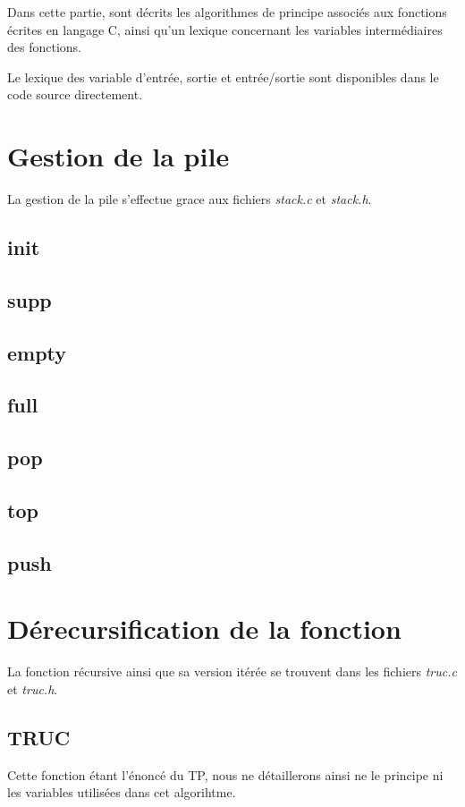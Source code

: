 Dans cette partie, sont décrits les algorithmes de principe associés aux fonctions écrites en langage C, ainsi qu'un lexique concernant les variables intermédiaires des fonctions.

Le lexique des variable d'entrée, sortie et entrée/sortie sont disponibles dans le code source directement.

\section{Gestion de la pile}
  La gestion de la pile s'effectue grace aux fichiers \textit{stack.c} et \textit{stack.h}.
  
  \subsection{init}
  \subsection{supp}
  \subsection{empty}
  \subsection{full}
  \subsection{pop}
  \subsection{top}
  \subsection{push}

\section{Dérecursification de la fonction}
  La fonction récursive ainsi que sa version itérée se trouvent dans les fichiers \textit{truc.c} et \textit{truc.h}.
  \subsection{TRUC}
    Cette fonction étant l'énoncé du TP, nous ne détaillerons ainsi ne le principe ni les variables utilisées dans cet algorihtme.
    
